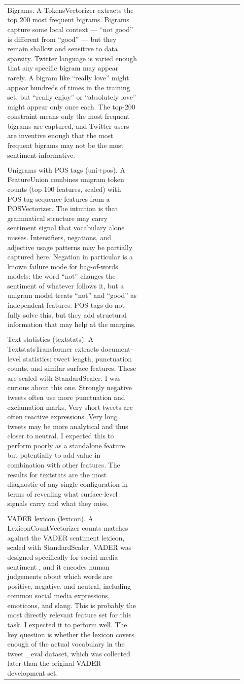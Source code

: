 \documentclass[11pt]{article}
\begin{document}
\begin{longtable}{|p{0.55\linewidth}|p{0.40\linewidth}|}
\hline
\rule{0pt}{3.5cm} & \\
\hline
Bigrams. A TokensVectorizer extracts the top 200 most frequent bigrams. Bigrams capture some local context --- ``not good'' is different from ``good'' --- but they remain shallow and sensitive to data sparsity. Twitter language is varied enough that any specific bigram may appear rarely. A bigram like ``really love'' might appear hundreds of times in the training set, but ``really enjoy'' or ``absolutely love'' might appear only once each. The top-200 constraint means only the most frequent bigrams are captured, and Twitter users are inventive enough that the most frequent bigrams may not be the most sentiment-informative. & \\[2pt]
\hline
\rule{0pt}{3.5cm} & \\
\hline
Unigrams with POS tags (uni+pos). A FeatureUnion combines unigram token counts (top 100 features, scaled) with POS tag sequence features from a POSVectorizer. The intuition is that grammatical structure may carry sentiment signal that vocabulary alone misses. Intensifiers, negations, and adjective usage patterns may be partially captured here. Negation in particular is a known failure mode for bag-of-words models: the word ``not'' changes the sentiment of whatever follows it, but a unigram model treats ``not'' and ``good'' as independent features. POS tags do not fully solve this, but they add structural information that may help at the margins. & \\[2pt]
\hline
\rule{0pt}{3.5cm} & \\
\hline
Text statistics (textstats). A TextstatsTransformer extracts document-level statistics: tweet length, punctuation counts, and similar surface features. These are scaled with StandardScaler. I was curious about this one. Strongly negative tweets often use more punctuation and exclamation marks. Very short tweets are often reactive expressions. Very long tweets may be more analytical and thus closer to neutral. I expected this to perform poorly as a standalone feature but potentially to add value in combination with other features. The results for textstats are the most diagnostic of any single configuration in terms of revealing what surface-level signals carry and what they miss. & \\[2pt]
\hline
\rule{0pt}{3.5cm} & \\
\hline
VADER lexicon (lexicon). A LexiconCountVectorizer counts matches against the VADER sentiment lexicon, scaled with StandardScaler. VADER was designed specifically for social media sentiment , and it encodes human judgements about which words are positive, negative, and neutral, including common social media expressions, emoticons, and slang. This is probably the most directly relevant feature set for this task. I expected it to perform well. The key question is whether the lexicon covers enough of the actual vocabulary in the tweet \_eval dataset, which was collected later than the original VADER development set. & \\[2pt]

\end{longtable}
\end{document}
